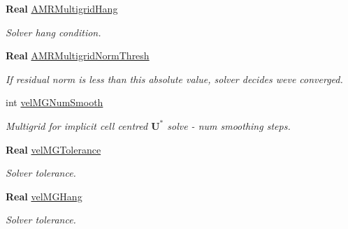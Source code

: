 \begin{DoxyCompactItemize}
\mbox{\label{struct_mushy_layer_options_aa14e7c8f812854ec6064d900ca2d322a}} 
\textbf{ Real} \hyperlink{struct_mushy_layer_options_aa14e7c8f812854ec6064d900ca2d322a}{A\+M\+R\+Multigrid\+Hang}
\begin{DoxyCompactList}\small\item\em Solver hang condition. \end{DoxyCompactList}\item 
\mbox{\label{struct_mushy_layer_options_a02fbb10851813cc95d6465532020adb7}} 
\textbf{ Real} \hyperlink{struct_mushy_layer_options_a02fbb10851813cc95d6465532020adb7}{A\+M\+R\+Multigrid\+Norm\+Thresh}
\begin{DoxyCompactList}\small\item\em If residual norm is less than this absolute value, solver decides we\textquotesingle{}ve converged. \end{DoxyCompactList}\item 
\mbox{\label{struct_mushy_layer_options_a7b1f041859c963447dd12028132fedb2}} 
int \hyperlink{struct_mushy_layer_options_a7b1f041859c963447dd12028132fedb2}{vel\+M\+G\+Num\+Smooth}
\begin{DoxyCompactList}\small\item\em Multigrid for implicit cell centred $ \mathbf{U}^* $ solve -\/ num smoothing steps. \end{DoxyCompactList}\item 
\mbox{\label{struct_mushy_layer_options_a87cf39c4b1b9d7fbf101d607a9d575b0}} 
\textbf{ Real} \hyperlink{struct_mushy_layer_options_a87cf39c4b1b9d7fbf101d607a9d575b0}{vel\+M\+G\+Tolerance}
\begin{DoxyCompactList}\small\item\em Solver tolerance. \end{DoxyCompactList}\item 
\mbox{\label{struct_mushy_layer_options_a1244b96808d35b1702a894a8de2b6f69}} 
\textbf{ Real} \hyperlink{struct_mushy_layer_options_a1244b96808d35b1702a894a8de2b6f69}{vel\+M\+G\+Hang}
\begin{DoxyCompactList}\small\item\em Solver tolerance. \end{DoxyCompactList}\item 

\end{DoxyCompactItemize}
